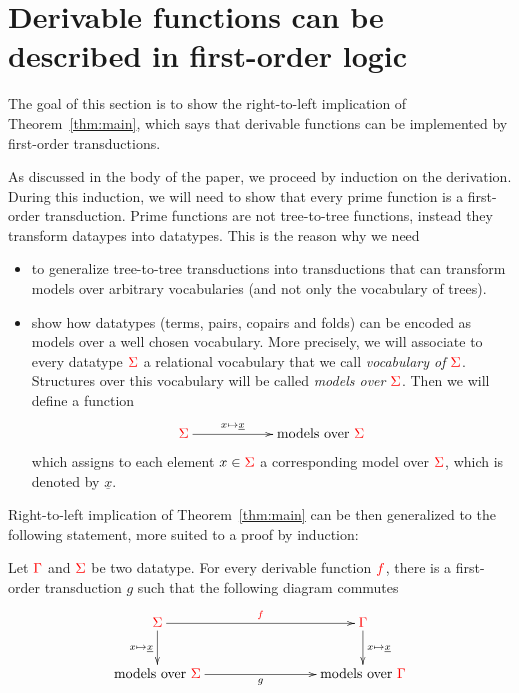 
\section{Derivable functions can be described in first-order logic}
\label{sec:to-logic}
The goal of this section is to show the right-to-left implication of Theorem~\ref{thm:main}, which says that derivable functions can be implemented by first-order transductions. 

As discussed in the body of the paper, we proceed by induction on the derivation. During this induction, we will need to show that every prime function is a first-order transduction. Prime functions are not tree-to-tree functions, instead they transform dataypes into datatypes. This is the reason why we need 
\begin{itemize}
\item to generalize tree-to-tree transductions into  transductions that can transform models over arbitrary vocabularies (and not only the vocabulary of trees). 
\item show how datatypes (terms, pairs, copairs and folds) can be encoded as models over a well chosen vocabulary. More precisely, we will associate to every datatype ${\color{red}{\Sigma}}$ a relational vocabulary that we call \emph{vocabulary of ${\color{red}{\Sigma}}$}. Structures over this vocabulary will be called \emph{models over ${\color{red}{\Sigma}}$}. Then we will define a function
\begin{align*}
    \xymatrix@C=2cm{
        \rSigma \ar[r]^-{x \mapsto \underline x} &
 \text{models over $\rSigma$}
    }
\end{align*} 
which assigns to each element $x \in {\color{red}{\Sigma}}$ a corresponding model  over ${\color{red}{\Sigma}}$, which is denoted by $\underline x$.
\end{itemize}
 
 Right-to-left implication of Theorem~\ref{thm:main} can be then generalized to the following statement, more suited to a proof by induction:

\begin{proposition}\label{prop:main-right-to-left}
Let ${\color{red}{\Gamma}}$ and ${\color{red}{\Sigma}}$ be two datatype.  For every derivable function ${\color{red}{f}}$, there is a first-order transduction $g$ such that the following diagram commutes
  \begin{align*}
  \xymatrix@C=2.8cm{
          \rSigma 
        \ar[d]_{x \mapsto \underline x}
        \ar[r]^-{\ranked{f}}
        &
    \rGamma \ar[d]^{x \mapsto \underline x}
        \\
      \text{models over $\rSigma$}
        \ar[r]_-{g}
        &
    \text{models over $\rGamma$}   
    } 
\end{align*}  
\end{proposition}

